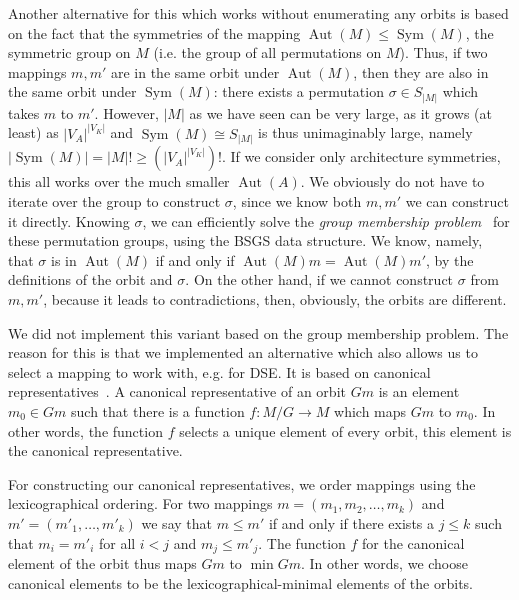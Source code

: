 Another alternative for this which works without enumerating any orbits is based on the fact that the symmetries of the mapping $\operatorname{Aut}(M) \leq \operatorname{Sym}(M)$, the symmetric group on $M$ (i.e. the group of all permutations on $M$).
Thus, if two mappings $m, m'$ are in the same orbit under $\operatorname{Aut}(M)$, then they are also in the same orbit under $\operatorname{Sym}(M)$: there exists a permutation $\sigma \in S_{|M|}$ which takes $m$ to $m'$.
However, $|M|$ as we have seen can be very large, as it grows (at least) as $|V_A|^{|V_K|}$ and $\operatorname{Sym}(M) \cong S_{|M|}$ is thus unimaginably large, namely $|\operatorname{Sym}(M)| = |M|! \geq (|V_A|^{|V_K|})!$.
If we consider only architecture symmetries, this all works over the much smaller $\operatorname{Aut}(A)$.  We obviously do not have to iterate over the group to construct $\sigma$, since we know both $m,m'$ we can construct it directly.
Knowing $\sigma$, we can efficiently solve the \emph{group membership problem}~\cite{seress2003permutation} for these permutation groups, using the \ac{BSGS} data structure.
We know, namely, that $\sigma$ is in $\operatorname{Aut}(M)$ if and only if $\operatorname{Aut}(M)m = \operatorname{Aut}(M)m'$, by the definitions of the orbit and $\sigma$.
On the other hand, if we cannot construct $\sigma$ from $m,m'$, because it leads to contradictions, then, obviously, the orbits are different.

We did not implement this variant based on the group membership problem.
The reason for this is that we implemented an alternative which also allows us to select a mapping to work with, e.g. for \ac{DSE}.
It is based on canonical representatives~\cite{goens_taco17,goens_mcsoc18}.
A canonical representative of an orbit $Gm$ is an element $m_0 \in Gm$ such that there is a function
$f : M / G \rightarrow M$ which maps $Gm$ to $m_0$.
In other words, the function $f$ selects a unique element of every orbit, this element is the canonical representative.

For constructing our canonical representatives, we order mappings using the lexicographical ordering.
For two mappings $m = (m_1,m_2,\ldots,m_k)$ and $m' = (m'_1,\ldots,m'_k)$ we say that $m \leq m'$ if and only if there exists a $j \leq k$ such that $m_i = m'_i$ for all $i < j$ and $m_j \leq m'_j$.
The function $f$ for the canonical element of the orbit thus maps $Gm$ to $\min Gm$.
In other words, we choose canonical elements to be the lexicographical-minimal elements of the orbits.

